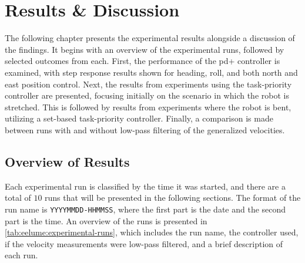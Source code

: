 \chapter{Results \& Discussion}

The following chapter presents the experimental results alongside a discussion 
of the findings. It begins with an overview of the experimental runs, followed 
by selected outcomes from each. First, the performance of the \gls{pd+} controller 
is examined, with step response results shown for heading, roll, and both 
north and east position control. Next, the results from experiments using the 
task-priority controller are presented, focusing initially on the scenario in which the 
robot is stretched. This is followed by results from experiments where the 
robot is bent, utilizing a set-based task-priority controller. Finally, a comparison is 
made between runs with and without low-pass filtering of the generalized velocities.


\section{Overview of Results}

Each experimental run is classified by the time it was started, and there are a total
of \(10\) runs that will be presented in the following sections. The format
of the run name is \texttt{YYYYMMDD-HHMMSS}, where the first part is the date
and the second part is the time. An overview of the runs is presented in
\autoref{tab:eelume:experimental-runs}, which includes the run name, the
controller used, if the velocity measurements were low-pass filtered, and a
brief description of each run.

